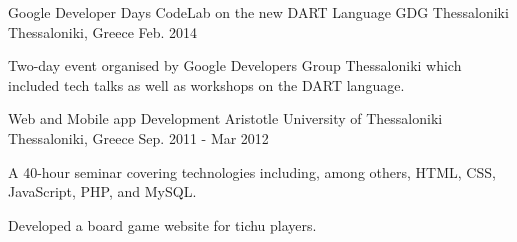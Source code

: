 \begin{cventries}
  \cventry
    {Google Developer Days CodeLab on the new DART Language} %
    {GDG Thessaloniki} %
    {Thessaloniki, Greece} %
    {Feb. 2014} %
    {
      \begin{cvitems} %
        \item {Two-day event organised by Google Developers Group Thessaloniki which included tech talks as well as workshops on the DART language.}
      \end{cvitems}
    }
    
  \cventry
    {Web and Mobile app Development} %
    {Aristotle University of Thessaloniki} %
    {Thessaloniki, Greece} %
    {Sep. 2011 - Mar 2012} %
    {
      \begin{cvitems} %
        \item {A 40-hour seminar covering technologies including, among others, HTML, CSS, JavaScript, PHP, and MySQL. }
        \item {Developed a board game website for tichu players.}
      \end{cvitems}
    }

\end{cventries}

